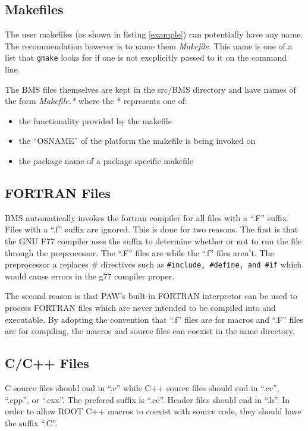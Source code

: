 \documentclass[12pt]{article}
\begin{document}
\subsection{Makefiles}
The user makefiles (as shown in listing \ref{example}) can potentially
have any name. The recommendation however is to name them {\it Makefile}.
This name is one of a list that {\lstinline !gmake!} looks for
if one is not excplicitly passed to it on the command line.

The BMS files themselves are kept in the src/BMS directory and have
names of the form {\it Makefile.*} where the * represents one of:

\begin{itemize}
	\item{} the functionality provided by the makefile
	\item{} the ``OSNAME'' of the platform the makefile is being invoked on
	\item{} the package name of a package specific makefile
\end{itemize}

\subsection{FORTRAN Files}
BMS automatically invokes the fortran compiler for all files with
a ``.F'' suffix. Files with a ``.f'' suffix are ignored. This is
done for two reasons. The first is that the GNU F77 compiler
uses the suffix to determine whether or not to run the file
through the preprocessor. The ``.F'' files are while the ``.f''
files aren't. The preprocessor a replaces $\#$ directives such as
{\lstinline !#include, #define, and #if!} which would cause errors
in the g77 compiler proper.

The second reason is that PAW's built-in FORTRAN interpretor can
be used to process FORTRAN files which are never intended to be
compiled into and executable. By adopting the convention that
``.f'' files are for macros and ``.F'' files are for compiling,
the macros and source files can coexist in the same directory.

\subsection{C/C++ Files}

C source files should end in ``.c'' while C++ source files should end
in ``.cc'', ``.cpp'', or ``.cxx''. The prefered suffix is ``.cc''.
Header files should end in ``.h''. In order to allow ROOT C++ macros
to coexist with source code, they should have the suffix ``.C''.
\end{document}
